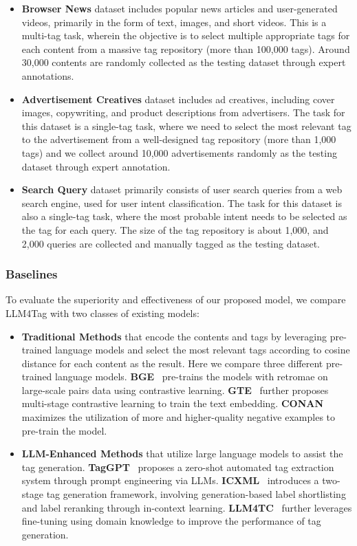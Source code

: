 \begin{itemize}[leftmargin = 12 pt]
\item \textbf{Browser News} dataset includes popular news articles and user-generated videos, primarily in the form of text, images, and short videos. This is a multi-tag task, wherein the objective is to select multiple appropriate tags for each content from a massive tag repository (more than 100,000 tags). Around 30,000 contents are randomly collected as the testing dataset through expert annotations.

\item \textbf{Advertisement Creatives} dataset includes ad creatives, including cover images, copywriting, and product descriptions from advertisers.
The task for this dataset is a single-tag task, where we need to select the most relevant tag to the advertisement from a well-designed tag repository (more than 1,000 tags) and we collect around 10,000 advertisements randomly as the testing dataset through expert annotation.
\item \textbf{Search Query} dataset primarily consists of user search queries from a web search engine, used for user intent classification.
The task for this dataset is also a single-tag task, where the most probable intent needs to be selected as the tag for each query. The size of the tag repository is about 1,000, and 2,000 queries are collected and manually tagged as the testing dataset.
 \end{itemize}
 
 \subsubsection{Baselines}
To evaluate the superiority and effectiveness of our proposed model, we compare LLM4Tag with two classes of existing models: 
\begin{itemize}[leftmargin = 12 pt]
\item \textbf{Traditional Methods} that encode the contents and tags by leveraging pre-trained language models and select the most relevant tags according to cosine distance for each content as the result. Here we compare three different pre-trained language models.
\textbf{BGE}~\cite{bge} pre-trains the models with retromae on large-scale pairs data using contrastive learning. \textbf{GTE}~\cite{gte} further proposes multi-stage contrastive learning to train the text embedding. \textbf{CONAN}~\cite{conan} maximizes the utilization of more and higher-quality negative examples to pre-train the model.
\item \textbf{LLM-Enhanced Methods} that utilize large language models to assist the tag generation. \textbf{TagGPT}~\cite{li2023taggpt} proposes a zero-shot automated tag extraction system through prompt engineering via LLMs. \textbf{ICXML}~\cite{zhu2023icxml} introduces a two-stage tag generation framework, involving generation-based label shortlisting and label reranking through in-context learning. \textbf{LLM4TC}~\cite{chae2023large} further leverages fine-tuning using domain knowledge to improve the performance of tag generation.
 \end{itemize}



